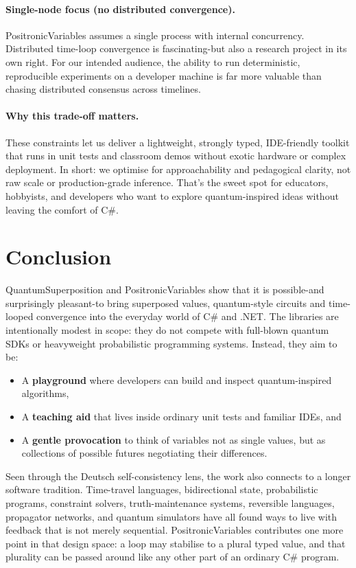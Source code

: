 \documentclass[a4paper,11pt]{article}
\begin{document}
\paragraph{Single-node focus (no distributed convergence).}
PositronicVariables assumes a single process with internal concurrency. Distributed time-loop convergence is fascinating-but also a research project in its own right. For our intended audience, the ability to run deterministic, reproducible experiments on a developer machine is far more valuable than chasing distributed consensus across timelines.

\paragraph{Why this trade-off matters.}
These constraints let us deliver a lightweight, strongly typed, IDE-friendly toolkit that runs in unit tests and classroom demos without exotic hardware or complex deployment. In short: we optimise for approachability and pedagogical clarity, not raw scale or production-grade inference. That's the sweet spot for educators, hobbyists, and developers who want to explore quantum-inspired ideas without leaving the comfort of C\#.

\section{Conclusion}

QuantumSuperposition and PositronicVariables show that it is possible-and surprisingly pleasant-to bring superposed values, quantum-style circuits and time-looped convergence into the everyday world of C\# and .NET. The libraries are intentionally modest in scope: they do not compete with full-blown quantum SDKs or heavyweight probabilistic programming systems. Instead, they aim to be:

\begin{itemize}
\item
  A \textbf{playground} where developers can build and inspect quantum-inspired algorithms,
\item
  A \textbf{teaching aid} that lives inside ordinary unit tests and familiar IDEs, and
\item
  A \textbf{gentle provocation} to think of variables not as single values, but as collections of possible futures negotiating their differences.
\end{itemize}

Seen through the Deutsch self-consistency lens, the work also connects to a longer
software tradition. Time-travel languages, bidirectional state, probabilistic programs,
constraint solvers, truth-maintenance systems, reversible languages, propagator networks,
and quantum simulators have all found ways to live with feedback that is not merely
sequential. PositronicVariables contributes one more point in that design space: a
loop may stabilise to a plural typed value, and that plurality can be passed around
like any other part of an ordinary C\# program.
\end{document}
